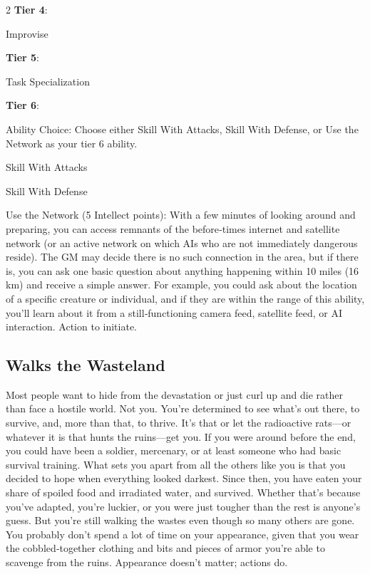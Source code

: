 \begin{multicols}{2}
\textbf{Tier 4}:

Improvise

\textbf{Tier 5}:

Task Specialization 

\textbf{Tier 6}:

Ability Choice: Choose either Skill With Attacks, Skill With Defense, or Use the Network as your tier 6 ability.

Skill With Attacks 

Skill With Defense 

Use the Network (5 Intellect points): With a few minutes of looking around and preparing, you can access remnants of the before‑times internet and satellite network (or an active network on which AIs who are not immediately dangerous reside). The GM may decide there is no such connection in the area, but if there is, you can ask one basic question about anything happening within 10 miles (16 km) and receive a simple answer. For example, you could ask about the location of a specific creature or individual, and if they are within the range of this ability, you’ll learn about it from a still‑functioning camera feed, satellite feed, or AI interaction. Action to initiate.

\subsection{Walks the Wasteland}

Most people want to hide from the devastation or just curl up and die rather than face a hostile world. Not you. You’re determined to see what’s out there, to survive, and, more than that, to thrive. It’s that or let the radioactive rats—or whatever it is that hunts the ruins—get you. If you were around before the end, you could have been a soldier, mercenary, or at least someone who had basic survival training. What sets you apart from all the others like you is that you decided to hope when everything looked darkest. Since then, you have eaten your share of spoiled food and irradiated water, and survived. Whether that’s because you’ve adapted, you’re luckier, or you were just tougher than the rest is anyone’s guess. But you’re still walking the wastes even though so many others are gone. You probably don’t spend a lot of time on your appearance, given that you wear the cobbled‑together clothing and bits and pieces of armor you’re able to scavenge from the ruins. Appearance doesn’t matter; actions do.


\end{multicols}
